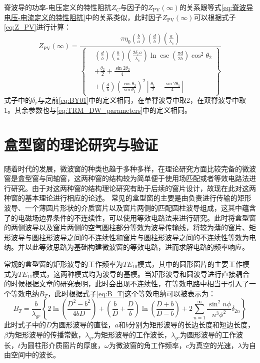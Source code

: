 \documentclass[master]{thesis-uestc}
\begin{document}
脊波导的功率-电压定义的特性阻抗\(Z_C\)与因子的\(Z_{\mathrm{PV}}(\infty)\)的关系跟等式\ref{eq:脊波导电压-电流定义的特性阻抗}中的关系类似，此时因子\(Z_{\mathrm{PV}}(\infty)\)可以根据式子\ref{eq:Z_PV}进行计算：
\begin{equation}\label{eq:Z_PV}
    Z_{\mathrm{PV}}(\infty) = \frac{\pi \eta_0 \left( \frac{b}{a} \right) \left( \frac{d}{b} \right) \left( \frac{a}{\lambda_c} \right)}{
        \left\{ 
            \begin{aligned}
                & \left( \frac{d}{b} \right) \left( \frac{b}{a} \right) \left( \frac{2 \delta_r a}{\lambda_c} \right) \ln \csc \left( \frac{\pi d}{2b} \right) \cos^2 \theta_2 \\
                & + \frac{\theta_2}{2} + \frac{\sin 2\theta_2}{4} \\
                & + \left( \frac{d}{b} \right) \left( \frac{\cos \theta_2}{\sin \theta_1} \right)^2 \left[ \frac{\theta_1}{2} - \frac{\sin 2\theta_1}{4} \right]
            \end{aligned}
        \right\}
    }
\end{equation}
式子中的$\delta_{r}$与之前\ref{eq:BY01}中的定义相同，在单脊波导中取2，在双脊波导中取1。其余参数也与\ref{eq:TRM_DW_parameters}中的定义相同。

\section{盒型窗的理论研究与验证}\label{sec:PillBoxTheory}
随着时代的发展，微波窗的种类也趋于多种多样，在理论研究方面比较完备的微波窗是盒型窗与同轴窗，这两种窗的结构较为简单便于使用场匹配或者等效电路法进行研究。由于对这两种窗的结构理论研究有助于后续的窗片设计，故现在此对这两种窗的基本理论进行相应的论述。
常见的盒型窗的主要是由负责进行传输的矩形波导、一个薄圆片形状的介质窗片以及窗片两侧的匹配圆柱波导组成，这其中蕴含了的电磁场边界条件的不连续性，可以使用等效电路法来进行研究。此时将盒型窗的两侧波导以及窗片两侧的空气圆柱部分等效为波导传输线，将较为薄的窗片、矩形波导与圆柱形波导之间的不连续性和窗片与圆柱形波导之间的不连续性等效为电纳。并以此等效思路为基础构建微波窗的等效电路，进而求解电路的频率响应。

常规的盒型窗的矩形波导的工作频率为$TE_{10}$模式，其中的圆形窗片的主要工作模式为$TE_{11}$模式，这两种模式均为波导的基模。当矩形波导和圆波导进行直接耦合的时候根据文章的研究表明，此时会出现不连续性，在等效电路中相当于引入了一个等效电纳$B_{T}$，此时根据式子\ref{eq:B_T}这个等效电纳可以被表示为：
\begin{equation}\label{eq:B_T}
    B_{T}=\frac{b}{\lambda_{g r}}\left\{2 \ln \left(\frac{D^{2}-b^{2}}{4 b D}\right)+\left(\frac{b}{D}+\frac{D}{b}\right) \ln \left(\frac{D+b}{D-b}\right)+2 \sum_{n=1}^{\infty} \frac{\sin ^{2} n \phi}{n^{3} \phi^{2}} \delta_{2 n}\right\}
\end{equation}
此时式子中的$D$为圆形波导的直径，$a$和$b$分别为矩形波导的长边长度和短边长度，$\beta$为矩形波导的传播常数，$\lambda_{g r}$为矩形波导的工作波长，$\lambda_{g c}$为圆形波导的工作波长，$t$为圆柱形介质窗片的厚度，$\omega$为微波窗的角工作频率，$c$为真空的光速，$\lambda$为自由空间中的波长。
\end{document}
